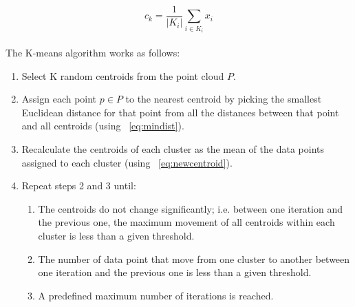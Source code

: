 \documentclass{article}
\begin{document}
\begin{equation}
    c_k=\frac{1}{|K_i|}\sum_{i\in K_i}x_i
    \label{eq:newcentroid}
\end{equation}
\\The K-means algorithm works as follows:
\begin{enumerate}
    \item Select K random centroids from the point cloud $P$.
    \item Assign each point $p \in P$ to the nearest centroid by picking the smallest Euclidean distance for that point from all the distances between that point and all centroids (using ~\ref{eq:mindist}).
    \item Recalculate the centroids of each cluster as the mean of the data points assigned to each cluster (using ~\ref{eq:newcentroid}).
    \item Repeat steps 2 and 3 until:
    \begin{enumerate}
        \item The centroids do not change significantly; i.e. between one iteration and the previous one, the maximum movement of all centroids within each cluster is less than a given threshold.
        \item The number of data point that move from one cluster to another between one iteration and the previous one is less than a given threshold.
        \item A predefined maximum number of iterations is reached.
    \end{enumerate}
\end{enumerate}
\end{document}
